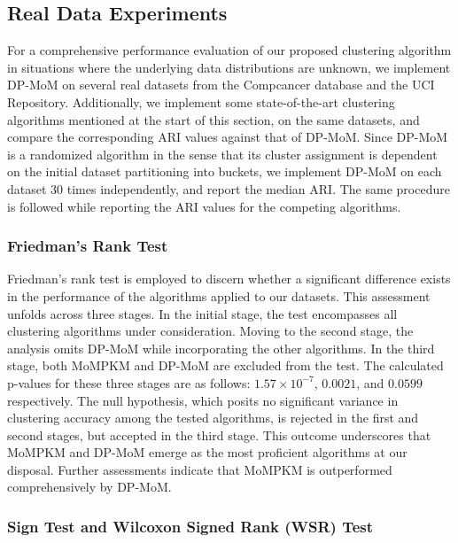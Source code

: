 \documentclass{article}
\begin{document}
\subsection{Real Data Experiments}




For a comprehensive performance evaluation of our proposed clustering algorithm in situations where the underlying data distributions are unknown, we implement DP-MoM on several real datasets from the Compcancer database and the UCI Repository. Additionally, we implement some state-of-the-art clustering algorithms mentioned at the start of this section, on the same datasets, and compare the corresponding ARI values against that of DP-MoM. Since DP-MoM is a randomized algorithm in the sense that its cluster assignment is dependent on the initial dataset partitioning into buckets, we implement DP-MoM on each dataset $30$ times independently, and report the median ARI. The same procedure is followed while reporting the ARI values for the competing algorithms.

\subsubsection{Friedman's Rank Test} 
Friedman's rank test \cite{friedman} is employed to discern whether a significant difference exists in the performance of the algorithms applied to our datasets. This assessment unfolds across three stages. In the initial stage, the test encompasses all clustering algorithms under consideration. Moving to the second stage, the analysis omits DP-MoM while incorporating the other algorithms. In the third stage, both MoMPKM and DP-MoM are excluded from the test. The calculated p-values for these three stages are as follows: $1.57 \times 10^{-7}$, $0.0021$, and $0.0599$ respectively. The null hypothesis, which posits no significant variance in clustering accuracy among the tested algorithms, is rejected in the first and second stages, but accepted in the third stage. This outcome underscores that MoMPKM and DP-MoM emerge as the most proficient algorithms at our disposal. Further assessments indicate that MoMPKM is outperformed comprehensively by DP-MoM. 

\subsubsection{Sign Test and Wilcoxon Signed Rank (WSR) Test}
\end{document}
